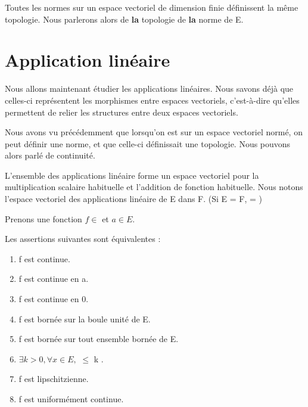 \begin{proposition}
	Toutes les normes sur un espace vectoriel de dimension finie définissent la
	même topologie. Nous parlerons alors de \textbf{la} topologie de \textbf{la} norme de E.
\end{proposition}

\section{Application linéaire}
Nous allons maintenant étudier les applications linéaires. Nous savons déjà que
celles-ci représentent les morphismes entre espaces vectoriels, c'est-à-dire
qu'elles permettent de relier les structures entre deux espaces vectoriels.

Nous avons vu précédemment que lorsqu'on est sur un espace vectoriel normé, on
peut définir une norme, et que celle-ci définissait une topologie. Nous pouvons
alors parlé de continuité.

\begin{definition}
	L'ensemble des applications linéaire forme un espace vectoriel pour la
	multiplication scalaire habituelle et l'addition de fonction habituelle.
	Nous notons  l'espace vectoriel des applications
	linéaire de E dans F. (Si E = F,  =
	)
\end{definition}

Prenons une fonction $f \in$  et $a \in E$.

\begin{proposition}
	Les assertions suivantes sont équivalentes :

	\begin{enumerate}
		\item f est continue.
		\item f est continue en a.
		\item f est continue en 0.
		\item f est bornée sur la boule unité de E.
		\item f est bornée sur tout ensemble bornée de E.
		\item $\exists k > 0, \forall x \in E,$  $\leq$ k
			.
		\item f est lipschitzienne.
		\item f est uniformément continue.
	\end{enumerate}
\end{proposition}

